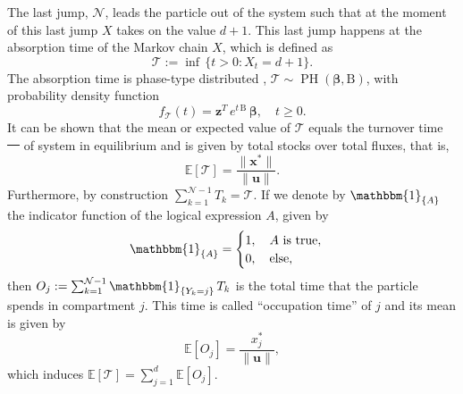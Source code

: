 \documentclass[smallextended]{svjour3}
\makeatletter
\renewcommand*{\eqref}[1]{%
  \hyperref[{#1}]{\textup{\tagform@{\ref*{#1}}}}%
}
\renewcommand{\tens}[1]{\mathrm{#1}}
\renewcommand{\vec}[1]{\mathbf{#1}}
\newcommand{\E}{\mathbb{E}}
\newcommand{\TT}{\mathcal{T}}
\newcommand{\PH}{\operatorname{PH}}
\newcommand{\vnorms}[1]{\|#1\|}
\newcommand{\ie}{that is}
\newcommand{\pdf}{probability density function}
\renewcommand{\emph}[1]{``#1''}
\providecommand{\DIFaddtex}[1]{{\protect\color{blue}\uwave{#1}}} %
\providecommand{\DIFdeltex}[1]{{\protect\color{red}\sout{#1}}}                      %
\providecommand{\DIFaddbegin}{} %
\providecommand{\DIFaddend}{} %
\providecommand{\DIFdelbegin}{} %
\providecommand{\DIFdelend}{} %
\providecommand{\DIFadd}[1]{\texorpdfstring{\DIFaddtex{#1}}{#1}} %
\providecommand{\DIFdel}[1]{\texorpdfstring{\DIFdeltex{#1}}{}} %
\newcommand{\DIFscaledelfig}{0.5}
\newlength{\DIFdelgraphicswidth} %
\newlength{\DIFdelgraphicsheight} %
\newcommand{\DIFaddincludegraphics}[2][]{{\color{blue}\fbox{\DIFOincludegraphics[#1]{#2}}}} %
\newcommand{\DIFdelincludegraphics}[2][]{%
\sbox{\DIFdelgraphicsbox}{\DIFOincludegraphics[#1]{#2}}%
\settoboxwidth{\DIFdelgraphicswidth}{\DIFdelgraphicsbox} %
\settoboxtotalheight{\DIFdelgraphicsheight}{\DIFdelgraphicsbox} %
\scalebox{\DIFscaledelfig}{%
\parbox[b]{\DIFdelgraphicswidth}{\usebox{\DIFdelgraphicsbox}\\[-\baselineskip] \rule{\DIFdelgraphicswidth}{0em}}\llap{\resizebox{\DIFdelgraphicswidth}{\DIFdelgraphicsheight}{%
\setlength{\unitlength}{\DIFdelgraphicswidth}%
\begin{picture}(1,1)%
\thicklines\linethickness{2pt} %
{\color[rgb]{1,0,0}\put(0,0){\framebox(1,1){}}}%
{\color[rgb]{1,0,0}\put(0,0){\line( 1,1){1}}}%
{\color[rgb]{1,0,0}\put(0,1){\line(1,-1){1}}}%
\end{picture}%
}\hspace*{3pt}}} %
} %
\DeclareRobustCommand{\DIFaddbegin}{\DIFOaddbegin \let\includegraphics\DIFaddincludegraphics} %
\DeclareRobustCommand{\DIFaddend}{\DIFOaddend \let\includegraphics\DIFOincludegraphics} %
\DeclareRobustCommand{\DIFdelbegin}{\DIFOdelbegin \let\includegraphics\DIFdelincludegraphics} %
\DeclareRobustCommand{\DIFdelend}{\DIFOaddend \let\includegraphics\DIFOincludegraphics} %
\makeatother
\begin{document}
The last jump, $\mathcal{N}$, leads the particle out of the system such that at the moment of this last jump $X$ takes on the value $d+1$.
This last jump happens at the absorption time of the Markov chain $X$, which is defined as
\begin{equation}
   \TT := \inf\,\{t>0: X_t=d+1\}.
\end{equation}
The absorption time is phase-type distributed \citep{Neuts1981}, $\TT\sim\PH(\vec{\beta},\tens{B})$, with \pdf
\begin{equation}
  f_{\TT}(t) = \vec{z}^T\,e^{t\,\tens{B}}\,\vec{\beta},\quad t\geq0.
\end{equation}
It can be shown \citep[Sect.~3.2]{Metzler2018MGS} that the mean or expected value of $\TT$ equals the turnover time \DIFdelbegin \DIFdel{\mbox{%
\citep{Sierra2016GlobChangBiol} }\hspace{0pt}%
}\DIFdelend \DIFaddbegin \DIFadd{\mbox{%
\citep{Sierra2017GCB} }\hspace{0pt}%
}\DIFaddend of system \eqref{eqn:lin_CS_sys} in equilibrium and is given by total stocks over total fluxes, \ie, 
\begin{equation}
  \E\left[\TT\right] = \frac{\vnorms{\vec{x}^\ast}}{\vnorms{\vec{u}}}.
\end{equation}
Furthermore, by construction $\sum_{k=1}^{\mathcal{N}-1} T_k = \TT$.
If we denote by $\mathbbm{1}_{\{A\}}$ the indicator function of the logical expression $A$, given by
\begin{equation}
  \mathbbm{1}_{\{A\}} =
  \begin{cases}
    1, \quad A\text{ is true},\\
    0, \quad\text{else},
  \end{cases}
\end{equation}
then $O_j:=\sum_{k=1}^{\mathcal{N}-1} \mathbbm{1}_{\{Y_k=j\}}\,T_k$ is the total time that the particle spends in compartment $j$.
This time is called \emph{occupation time} of $j$ and its mean is given by \citep[Sect.~3.3]{Metzler2018MGS}
\begin{equation}
  \label{eqn:occupation_time}
  \E\left[O_j\right] = \frac{x^\ast_j}{\vnorms{\vec{u}}},
\end{equation}
which induces $\E\left[\TT\right] = \sum_{j=1}^d \E\left[O_j\right]$.
\end{document}
